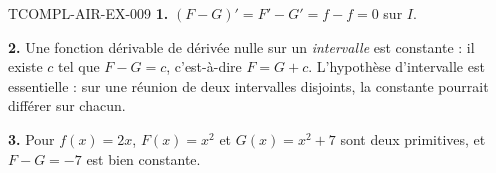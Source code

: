 \begin{corrige}{TCOMPL-AIR-EX-009}
\textbf{1.} $(F-G)'=F'-G'=f-f=0$ sur $I$.

\textbf{2.} Une fonction dérivable de dérivée nulle sur un \emph{intervalle}
est constante : il existe $c$ tel que $F-G=c$, c'est-à-dire $F=G+c$.
L'hypothèse d'intervalle est essentielle : sur une réunion de deux
intervalles disjoints, la constante pourrait différer sur chacun.

\textbf{3.} Pour $f(x)=2x$, $F(x)=x^2$ et $G(x)=x^2+7$ sont deux primitives,
et $F-G=-7$ est bien constante.
\end{corrige}
